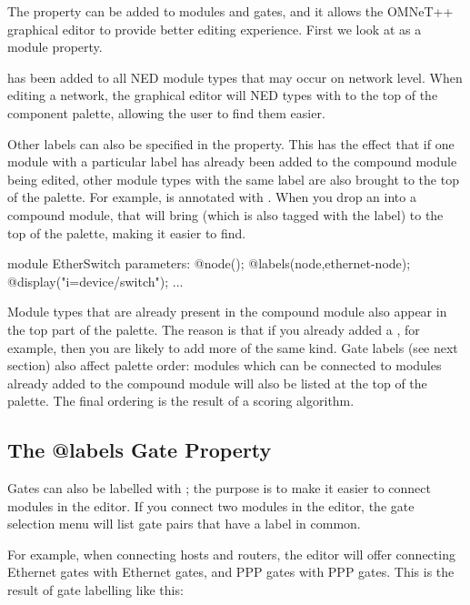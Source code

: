 The  property can be added to modules and gates, and it
allows the OMNeT++ graphical editor to provide better editing experience.
First we look at  as a module property.

 has been added to all NED module types that may occur on
network level. When editing a network, the graphical editor will NED types
with  to the top of the component palette, allowing the
user to find them easier.

Other labels can also be specified in the  property. This
has the effect that if one module with a particular label has already been
added to the compound module being edited, other module types with the same
label are also brought to the top of the palette. For example,
 is annotated with .
When you drop an  into a compound module, that will
bring  (which is also tagged with the
 label) to the top of the palette, making it easier to
find.

\begin{ned}
module EtherSwitch
{
    parameters:
        @node();
        @labels(node,ethernet-node);
        @display("i=device/switch");
    ...
}
\end{ned}

Module types that are already present in the compound module also appear in
the top part of the palette. The reason is that if you already added a
, for example, then you are likely to add more of the
same kind. Gate labels (see next section) also affect palette order: modules
which can be connected to modules already added to the compound module
will also be listed at the top of the palette. The final ordering is the
result of a scoring algorithm.


\subsection{The @labels Gate Property}

Gates can also be labelled with ; the purpose is to make it easier
to connect modules in the editor. If you connect two modules in the editor,
the gate selection menu will list gate pairs that have a label in common.

\iffalse TODO
screenshot
\fi

For example, when connecting hosts and routers, the editor will offer connecting
Ethernet gates with Ethernet gates, and PPP gates with PPP gates. This is the
result of gate labelling like this:

